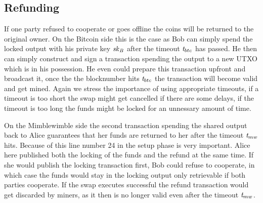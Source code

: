 \subsection{Refunding}\label{subsec:atom:refund}

If one party refused to cooperate or goes offline the coins will be returned to the original owner.
On the Bitcoin side this is the case as Bob can simply spend the locked output with his private key $\mathit{sk}_{\mathit{B}}$ after the timeout $\mathit{t}_{btc}$ has passed.
He then can simply construct and sign a transaction spending the output to a new UTXO which is in his possession.
He even could prepare this transaction upfront and broadcast it, once the the blocknumber hits $\mathit{t}_{btc}$ the transaction will become valid and get mined.
Again we stress the importance of using appropriate timeouts, if a timeout is too short the swap might get cancelled if there are some delays, if the timeout is too long the funds might be locked for an unnessary amount of time.

On the Mimblewimble side the second transaction spending the shared output back to Alice guarantees that her funds are returned to her after the timeout $\mathit{t}_{mw}$ hits.
Because of this line number 24 in the setup phase is very important.
Alice here published both the locking of the funds and the refund at the same time.
If she would publish the locking transaction first, Bob could refuse to cooperate, in which case the funds would stay in the locking output only retrievable if both parties cooperate.
If the swap executes successful the refund transaction would get discarded by miners, as it then is no longer valid even after the timeout $\mathit{t}_{mw}$.